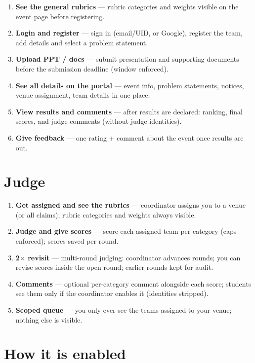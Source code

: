 \documentclass[11pt,a4paper]{article}
\begin{document}
\begin{enumerate}
  \item \textbf{See the general rubrics} --- rubric categories and weights visible on the event page before registering.
  \item \textbf{Login and register} --- sign in (email/UID, or Google), register the team, add details and select a problem statement.
  \item \textbf{Upload PPT / docs} --- submit presentation and supporting documents before the submission deadline (window enforced).
  \item \textbf{See all details on the portal} --- event info, problem statements, notices, venue assignment, team details in one place.
  \item \textbf{View results and comments} --- after results are declared: ranking, final scores, and judge comments (without judge identities).
  \item \textbf{Give feedback} --- one rating + comment about the event once results are out.
\end{enumerate}

\section{Judge}

\begin{enumerate}
  \item \textbf{Get assigned and see the rubrics} --- coordinator assigns you to a venue (or all claims); rubric categories and weights always visible.
  \item \textbf{Judge and give scores} --- score each assigned team per category (caps enforced); scores saved per round.
  \item \textbf{2$\times$ revisit} --- multi-round judging: coordinator advances rounds; you can revise scores inside the open round; earlier rounds kept for audit.
  \item \textbf{Comments} --- optional per-category comment alongside each score; students see them only if the coordinator enables it (identities stripped).
  \item \textbf{Scoped queue} --- you only ever see the teams assigned to your venue; nothing else is visible.
\end{enumerate}

\section{How it is enabled}
\end{document}
